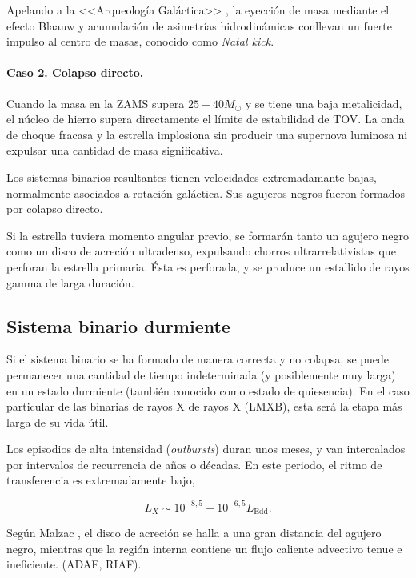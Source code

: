 Apelando a la <<Arqueología Galáctica>> \cite{mirabel}, la eyección de masa mediante el efecto Blaauw y acumulación de asimetrías hidrodinámicas conllevan un fuerte impulso al centro de masas, conocido como \textit{Natal kick}. 


\paragraph{Caso 2. Colapso directo.} Cuando la masa en la ZAMS supera $25-40M_{\odot}$ y se tiene una baja metalicidad, el núcleo de hierro supera directamente el límite de estabilidad de TOV. La onda de choque fracasa y la estrella implosiona sin producir una supernova luminosa ni expulsar una cantidad de masa significativa.

Los sistemas binarios resultantes tienen velocidades extremadamante bajas, normalmente asociados a rotación galáctica. Sus agujeros negros fueron formados por colapso directo. 

Si la estrella tuviera momento angular previo, se formarán tanto un agujero negro como un disco de acreción ultradenso, expulsando chorros ultrarrelativistas que perforan la estrella primaria. Ésta es perforada, y se produce un estallido de rayos gamma de larga duración.


\subsection{Sistema binario durmiente}

\noindent Si el sistema binario se ha formado de manera correcta y no colapsa, se puede permanecer una cantidad de tiempo indeterminada (y posiblemente muy larga) en un estado durmiente (también conocido como estado de quiesencia). En el caso particular de las binarias de rayos X de rayos X (LMXB), esta será la etapa más larga de su vida útil. 

Los episodios de alta intensidad (\textit{outbursts}) duran unos meses, y van intercalados por intervalos de recurrencia de años o décadas. En este periodo, el ritmo de transferencia es extremadamente bajo, 

\begin{equation}
  L_X\sim 10^{-8,5}-10^{-6,5}L_{\mbox{Edd}}.
\end{equation}

\noindent Según Malzac \cite{malzac}, el disco de acreción se halla a una gran distancia del agujero negro, mientras que la región interna contiene un flujo caliente advectivo tenue e ineficiente. (ADAF, RIAF).

